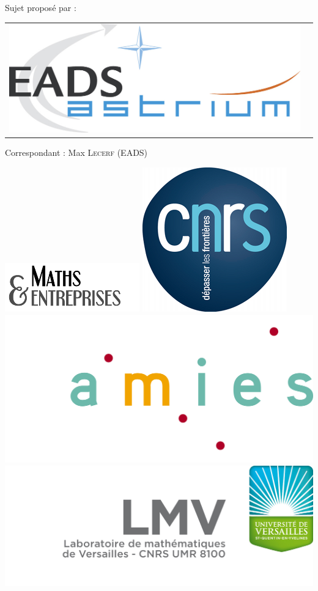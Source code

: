 \documentclass[a4paper,11pt]{article}
\numberwithin{section}{part}
\begin{document}
\vfill

\hspace{1cm}Sujet propos\'e par :
\begin{center}
\begin{tabular}{cc}
\includegraphics[scale=.4]{LOGO_EADS_ASTRIUM.jpg} 
\end{tabular}
\end{center}
\begin{center}
  \large \sffamily Correspondant : Max \textsc{Lecerf} (EADS)
\end{center}
\vfill
\vspace{3cm}
\includegraphics[width=0.27\linewidth]{logo_GDR_ME} \hfill
\includegraphics[width=0.12\linewidth]{logo_CNRS} \hfill
\includegraphics[width=0.27\linewidth]{logo_AMIES} \hfill
\includegraphics[width=0.30\linewidth]{logo_LMV}
\let\textsc\oldtextsc
\end{document}

